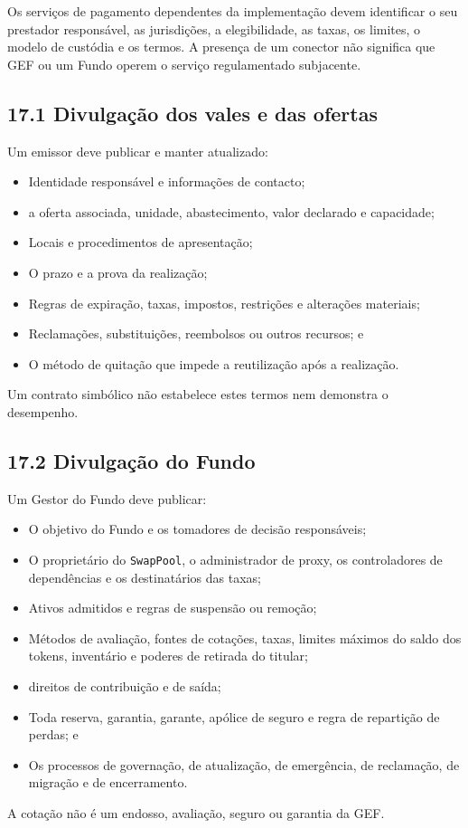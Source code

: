 \documentclass[11pt]{article}
\begin{document}
Os serviços de pagamento dependentes da implementação devem identificar o seu prestador responsável, as jurisdições, a elegibilidade, as taxas, os limites, o modelo de custódia e os termos. A presença de um conector não significa que GEF ou um Fundo operem o serviço regulamentado subjacente.

\subsection*{17.1 Divulgação dos vales e das ofertas}

Um emissor deve publicar e manter atualizado:

\begin{itemize}[leftmargin=*]
\item Identidade responsável e informações de contacto;
\item a oferta associada, unidade, abastecimento, valor declarado e capacidade;
\item Locais e procedimentos de apresentação;
\item O prazo e a prova da realização;
\item Regras de expiração, taxas, impostos, restrições e alterações materiais;
\item Reclamações, substituições, reembolsos ou outros recursos; e
\item O método de quitação que impede a reutilização após a realização.
\end{itemize}
Um contrato simbólico não estabelece estes termos nem demonstra o desempenho.

\subsection*{17.2 Divulgação do Fundo}

Um Gestor do Fundo deve publicar:

\begin{itemize}[leftmargin=*]
\item O objetivo do Fundo e os tomadores de decisão responsáveis;
\item O proprietário do \texttt{SwapPool}, o administrador de proxy, os controladores de dependências e os destinatários das taxas;
\item Ativos admitidos e regras de suspensão ou remoção;
\item Métodos de avaliação, fontes de cotações, taxas, limites máximos do saldo dos tokens, inventário e poderes de retirada do titular;
\item direitos de contribuição e de saída;
\item Toda reserva, garantia, garante, apólice de seguro e regra de repartição de perdas; e
\item Os processos de governação, de atualização, de emergência, de reclamação, de migração e de encerramento.
\end{itemize}
A cotação não é um endosso, avaliação, seguro ou garantia da GEF.
\end{document}

